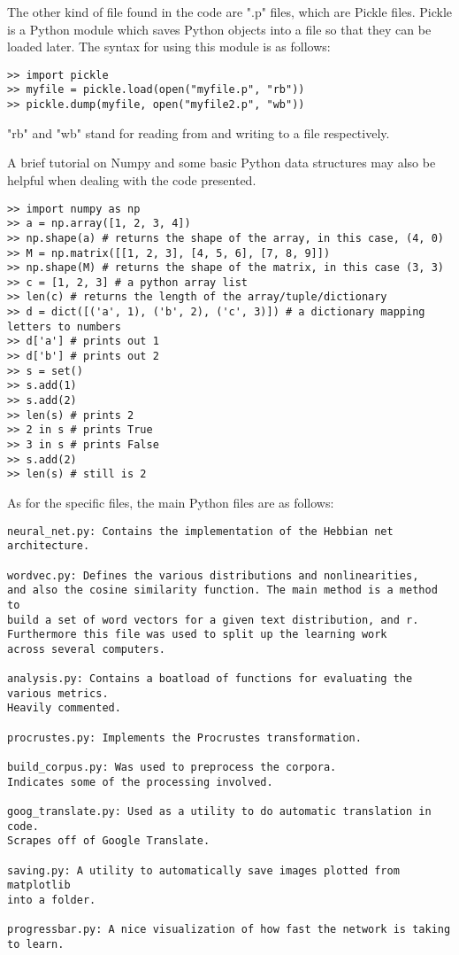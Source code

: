 \documentclass[12pt, usenames]{article}
\theoremstyle{definition}
\theoremstyle{definition}
\theoremstyle{definition}
\begin{document}
The other kind of file found in the code are ".p" files, which are Pickle files. Pickle is a Python module which saves Python objects into a file so that they can be loaded later. The syntax for using this module is as follows: 
\begin{verbatim}
>> import pickle
>> myfile = pickle.load(open("myfile.p", "rb"))
>> pickle.dump(myfile, open("myfile2.p", "wb"))
\end{verbatim}
"rb" and "wb" stand for reading from and writing to a file respectively. 

A brief tutorial on Numpy and some basic Python data structures may also be helpful when dealing with the code presented. 
\begin{verbatim}
>> import numpy as np
>> a = np.array([1, 2, 3, 4])
>> np.shape(a) # returns the shape of the array, in this case, (4, 0)
>> M = np.matrix([[1, 2, 3], [4, 5, 6], [7, 8, 9]])
>> np.shape(M) # returns the shape of the matrix, in this case (3, 3)
>> c = [1, 2, 3] # a python array list
>> len(c) # returns the length of the array/tuple/dictionary
>> d = dict([('a', 1), ('b', 2), ('c', 3)]) # a dictionary mapping letters to numbers
>> d['a'] # prints out 1
>> d['b'] # prints out 2
>> s = set()
>> s.add(1)
>> s.add(2)
>> len(s) # prints 2
>> 2 in s # prints True
>> 3 in s # prints False
>> s.add(2)
>> len(s) # still is 2
\end{verbatim}

As for the specific files, the main Python files are as follows: 

\begin{verbatim}
neural_net.py: Contains the implementation of the Hebbian net architecture. 

wordvec.py: Defines the various distributions and nonlinearities, 
and also the cosine similarity function. The main method is a method to 
build a set of word vectors for a given text distribution, and r. 
Furthermore this file was used to split up the learning work 
across several computers.

analysis.py: Contains a boatload of functions for evaluating the various metrics. 
Heavily commented. 

procrustes.py: Implements the Procrustes transformation.

build_corpus.py: Was used to preprocess the corpora. 
Indicates some of the processing involved.

goog_translate.py: Used as a utility to do automatic translation in code. 
Scrapes off of Google Translate.

saving.py: A utility to automatically save images plotted from matplotlib 
into a folder. 

progressbar.py: A nice visualization of how fast the network is taking to learn.

\end{verbatim}
\end{document}
